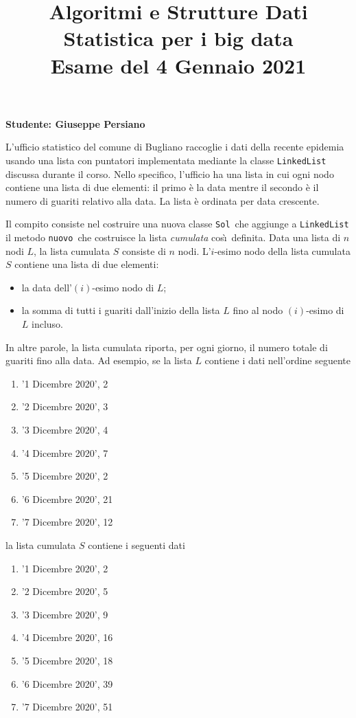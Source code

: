 \documentclass{amsart}
\begin{document}
\title{Algoritmi e Strutture Dati\\
Statistica per i big data\\
Esame del 4 Gennaio 2021
}


\newcommand{\NomeStudente}{Giuseppe Persiano}
\newcommand{\nomeClasse}{{\tt{Sol}}}
\newcommand{\nomeMetodo}{{\tt{nuovo}}}
\newcommand{\oraconsegna}{10:35}
\newcommand{\dataoggi}{4 Gennaio, 2021}


\maketitle

\hfill{{\bf Studente: \NomeStudente}}

\smallskip
L'ufficio statistico del comune di Bugliano raccoglie i dati della
recente epidemia usando una lista con puntatori implementata mediante la 
classe {\tt{LinkedList}} discussa durante il corso.
Nello specifico, l'ufficio ha una lista in cui ogni nodo contiene una
lista di due elementi: il primo \`e la data mentre il secondo \`e il
numero di guariti relativo alla data.
La lista \`e ordinata per data crescente. 

Il compito consiste nel costruire una nuova classe \nomeClasse\ che 
aggiunge a {\tt{LinkedList}} il metodo \nomeMetodo\
che costruisce la lista {\em cumulata} cos\`\i\ definita.
Data una lista di $n$ nodi $L$, la lista cumulata $S$ consiste di $n$
nodi. L'$i$-esimo nodo della lista cumulata $S$ contiene una lista
di due elementi:
\begin{itemize}
\item la data dell'$(i)$-esimo nodo di $L$;
\item la somma di tutti i guariti dall'inizio della lista $L$ fino al
nodo $(i)$-esimo di $L$ incluso.
\end{itemize}
In altre parole, la lista cumulata riporta, per ogni giorno,
il numero totale di guariti fino alla data.
Ad esempio, 
se la lista $L$ contiene i dati nell'ordine seguente
\begin{enumerate}
\item '1 Dicembre 2020', 2
\item '2 Dicembre 2020', 3
\item '3 Dicembre 2020', 4
\item '4 Dicembre 2020', 7
\item '5 Dicembre 2020', 2
\item '6 Dicembre 2020', 21
\item '7 Dicembre 2020', 12
\end{enumerate}
la lista cumulata $S$ contiene i seguenti dati
\begin{enumerate}
\item '1 Dicembre 2020', 2
\item '2 Dicembre 2020', 5
\item '3 Dicembre 2020', 9
\item '4 Dicembre 2020', 16
\item '5 Dicembre 2020', 18
\item '6 Dicembre 2020', 39
\item '7 Dicembre 2020', 51
\end{enumerate}
\end{document}
